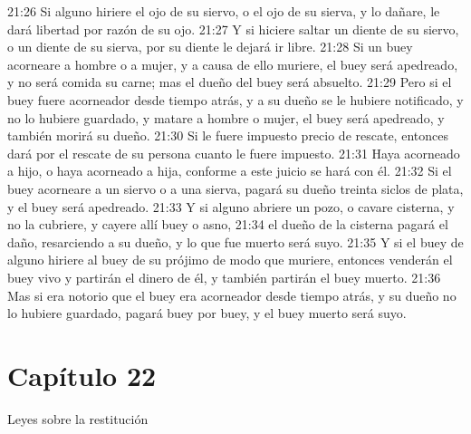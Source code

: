21:26 Si alguno hiriere el ojo de su siervo, o el ojo de su sierva, y lo dañare, le dará libertad por razón de su ojo. 
21:27 Y si hiciere saltar un diente de su siervo, o un diente de su sierva, por su diente le dejará ir libre. 
21:28 Si un buey acorneare a hombre o a mujer, y a causa de ello muriere, el buey será apedreado, y no será comida su carne; mas el dueño del buey será absuelto. 
21:29 Pero si el buey fuere acorneador desde tiempo atrás, y a su dueño se le hubiere notificado, y no lo hubiere guardado, y matare a hombre o mujer, el buey será apedreado, y también morirá su dueño. 
21:30 Si le fuere impuesto precio de rescate, entonces dará por el rescate de su persona cuanto le fuere impuesto. 
21:31 Haya acorneado a hijo, o haya acorneado a hija, conforme a este juicio se hará con él. 
21:32 Si el buey acorneare a un siervo o a una sierva, pagará su dueño treinta siclos de plata, y el buey será apedreado. 
21:33 Y si alguno abriere un pozo, o cavare cisterna, y no la cubriere, y cayere allí buey o asno, 
21:34 el dueño de la cisterna pagará el daño, resarciendo a su dueño, y lo que fue muerto será suyo. 
21:35 Y si el buey de alguno hiriere al buey de su prójimo de modo que muriere, entonces venderán el buey vivo y partirán el dinero de él, y también partirán el buey muerto. 
21:36 Mas si era notorio que el buey era acorneador desde tiempo atrás, y su dueño no lo hubiere guardado, pagará buey por buey, y el buey muerto será suyo. 
\section*{Capítulo 22}
Leyes sobre la restitución 

